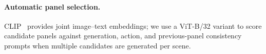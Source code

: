 \paragraph{Automatic panel selection.}
CLIP~\cite{radford2021learning} provides joint image--text embeddings; we use a ViT-B/32 variant to score candidate panels against generation, action, and previous-panel consistency prompts when multiple candidates are generated per scene.
